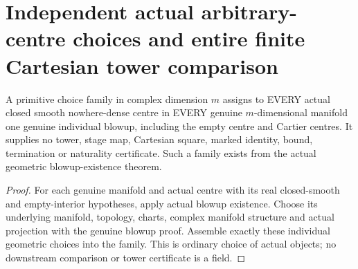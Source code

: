 \section{Independent actual arbitrary-centre choices and entire finite Cartesian tower comparison}

\begin{definition}
\label{hir:submersion-cartesian-choice-primitive}
\leanok
{}
A primitive choice family in complex dimension $m$ assigns to EVERY actual
closed smooth nowhere-dense centre in EVERY genuine $m$-dimensional manifold
one genuine individual blowup, including the empty centre and Cartier
centres. It supplies no tower, stage map, Cartesian square, marked identity,
bound, termination or naturality certificate. Such a family exists from
the actual geometric blowup-existence theorem.
\end{definition}
\begin{proof}
For each genuine manifold and actual centre with its real closed-smooth
and empty-interior hypotheses, apply actual blowup existence. Choose its
underlying manifold, topology, charts, complex manifold structure and actual
projection with the genuine blowup proof. Assemble exactly these individual
geometric choices into the family. This is ordinary choice of actual
objects; no downstream comparison or tower certificate is a field.
\end{proof}


